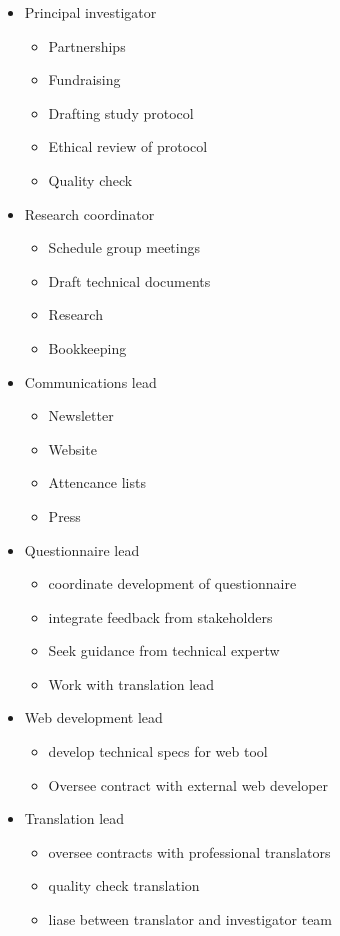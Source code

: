 \documentclass[
  letterpaper,
  DIV=11,
  numbers=noendperiod,
  oneside]{scrreprt}
\begin{document}
\begin{itemize}
\item
  Principal investigator

  \begin{itemize}
  \item
    Partnerships
  \item
    Fundraising
  \item
    Drafting study protocol
  \item
    Ethical review of protocol
  \item
    Quality check
  \end{itemize}
\item
  Research coordinator

  \begin{itemize}
  \item
    Schedule group meetings
  \item
    Draft technical documents
  \item
    Research
  \item
    Bookkeeping
  \end{itemize}
\item
  Communications lead

  \begin{itemize}
  \item
    Newsletter
  \item
    Website
  \item
    Attencance lists
  \item
    Press
  \end{itemize}
\item
  Questionnaire lead

  \begin{itemize}
  \item
    coordinate development of questionnaire
  \item
    integrate feedback from stakeholders
  \item
    Seek guidance from technical expertw
  \item
    Work with translation lead
  \end{itemize}
\item
  Web development lead

  \begin{itemize}
  \item
    develop technical specs for web tool
  \item
    Oversee contract with external web developer
  \end{itemize}
\item
  Translation lead

  \begin{itemize}
  \item
    oversee contracts with professional translators
  \item
    quality check translation
  \item
    liase between translator and investigator team
  \end{itemize}
\end{itemize}
\end{document}
